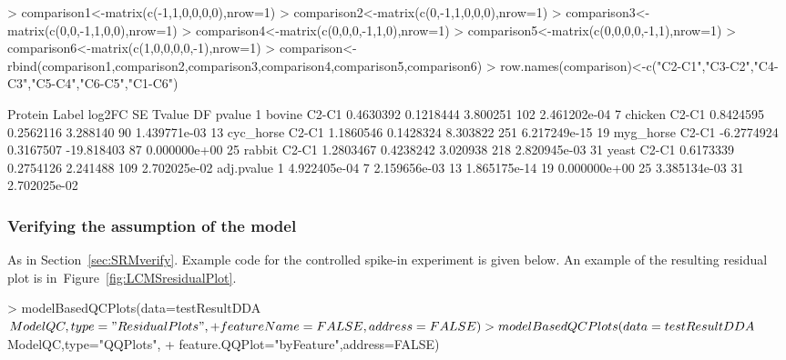 \documentclass[11pt]{article}
\def\figref#1{Figure~\ref{fig:#1}}
\def\secref#1{Section~\ref{sec:#1}}
\begin{document}
\begin{small}
\begin{Schunk}
\begin{Sinput}
> comparison1<-matrix(c(-1,1,0,0,0,0),nrow=1)
> comparison2<-matrix(c(0,-1,1,0,0,0),nrow=1)
> comparison3<-matrix(c(0,0,-1,1,0,0),nrow=1)
> comparison4<-matrix(c(0,0,0,-1,1,0),nrow=1)
> comparison5<-matrix(c(0,0,0,0,-1,1),nrow=1)
> comparison6<-matrix(c(1,0,0,0,0,-1),nrow=1)
> comparison<-rbind(comparison1,comparison2,comparison3,comparison4,comparison5,comparison6)
> row.names(comparison)<-c("C2-C1","C3-C2","C4-C3","C5-C4","C6-C5","C1-C6")
\end{Sinput}
\end{Schunk}


\begin{Schunk}
\begin{Soutput}
     Protein Label     log2FC        SE     Tvalue  DF       pvalue
1     bovine C2-C1  0.4630392 0.1218444   3.800251 102 2.461202e-04
7    chicken C2-C1  0.8424595 0.2562116   3.288140  90 1.439771e-03
13 cyc_horse C2-C1  1.1860546 0.1428324   8.303822 251 6.217249e-15
19 myg_horse C2-C1 -6.2774924 0.3167507 -19.818403  87 0.000000e+00
25    rabbit C2-C1  1.2803467 0.4238242   3.020938 218 2.820945e-03
31     yeast C2-C1  0.6173339 0.2754126   2.241488 109 2.702025e-02
     adj.pvalue
1  4.922405e-04
7  2.159656e-03
13 1.865175e-14
19 0.000000e+00
25 3.385134e-03
31 2.702025e-02
\end{Soutput}
\end{Schunk}
\end{small}

\subsubsection{Verifying the assumption of the model \label{sec:DDAverify}}
As in \secref{SRMverify}. Example code for the controlled spike-in experiment is given below. An example of the resulting residual plot is in~\figref{LCMSresidualPlot}.

\begin{small}
\begin{Schunk}
\begin{Sinput}
> modelBasedQCPlots(data=testResultDDA$ModelQC,type="ResidualPlots",
+                   featureName=FALSE, address=FALSE)
> modelBasedQCPlots(data=testResultDDA$ModelQC,type="QQPlots", 
+                   feature.QQPlot="byFeature",address=FALSE)
\end{Sinput}
\end{Schunk}
\end{small}
\end{document}
